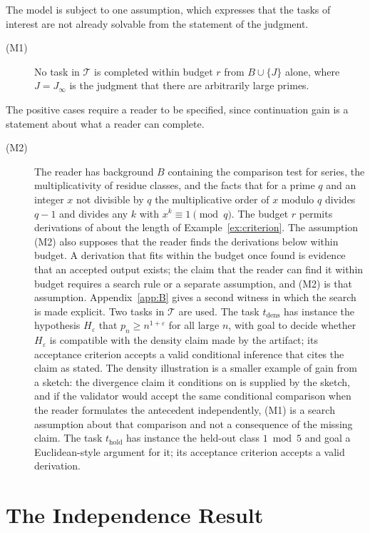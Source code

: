 \documentclass[11pt]{book}
\theoremstyle{definition}
\theoremstyle{remark}
\begin{document}
The model is subject to one assumption, which expresses that the tasks of interest are not already solvable from the statement of the judgment.

\begin{description}
\item[(M1)] No task in $\mathcal T$ is completed within budget $r$ from $B\cup\{J\}$ alone, where $J=J_\infty$ is the judgment that there are arbitrarily large primes.
\end{description}

The positive cases require a reader to be specified, since continuation gain is a statement about what a reader can complete.

\begin{description}
\item[(M2)] The reader has background $B$ containing the comparison test for series, the multiplicativity of residue classes, and the facts that for a prime $q$ and an integer $x$ not divisible by $q$ the multiplicative order of $x$ modulo $q$ divides $q-1$ and divides any $k$ with $x^k\equiv1\pmod q$. The budget $r$ permits derivations of about the length of Example~\ref{ex:criterion}. The assumption (M2) also supposes that the reader finds the derivations below within budget. A derivation that fits within the budget once found is evidence that an accepted output exists; the claim that the reader can find it within budget requires a search rule or a separate assumption, and (M2) is that assumption. Appendix~\ref{app:B} gives a second witness in which the search is made explicit. Two tasks in $\mathcal T$ are used. The task $t_{\mathrm{dens}}$ has instance the hypothesis $H_\varepsilon$ that $p_n\ge n^{1+\varepsilon}$ for all large $n$, with goal to decide whether $H_\varepsilon$ is compatible with the density claim made by the artifact; its acceptance criterion accepts a valid conditional inference that cites the claim as stated. The density illustration is a smaller example of gain from a sketch: the divergence claim it conditions on is supplied by the sketch, and if the validator would accept the same conditional comparison when the reader formulates the antecedent independently, (M1) is a search assumption about that comparison and not a consequence of the missing claim. The task $t_{\mathrm{hold}}$ has instance the held-out class $1\bmod5$ and goal a Euclidean-style argument for it; its acceptance criterion accepts a valid derivation.
\end{description}

\section{The Independence Result}
\end{document}
